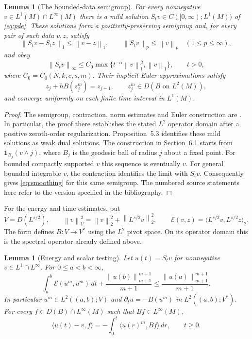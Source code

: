 \documentclass[11pt]{article}
\newtheorem{lemma}[theorem]{Lemma}
\theoremstyle{remark}
\newcommand{\E}{\mathcal E}
\newcommand{\norm}[1]{\left\lVert#1\right\rVert}
\begin{document}
\begin{lemma}[The bounded-data semigroup]\label{lem:semigroup}
For every nonnegative $v\in L^1(M)\cap L^\infty(M)$ there is a mild
solution $S_tv\in C([0,\infty);L^1(M))$ of \eqref{eq:pde}.
These solutions form a positivity-preserving semigroup and, for every
pair of such data $v,z$, satisfy
\begin{equation}\label{eq:contraction}
 \norm{S_tv-S_tz}_1\le\norm{v-z}_1,
 \qquad \norm{S_tv}_p\le\norm v_p\quad(1\le p\le\infty),
\end{equation}
and obey
\begin{equation}\label{eq:smoothing}
 \norm{S_tv}_\infty\le C_0
   \max\{t^{-\alpha}\norm v_1^\beta,\norm v_1\},\qquad t>0,
\end{equation}
where $C_0=C_0(N,k,c,s,m)$. Their implicit Euler approximations satisfy
\begin{equation}\label{eq:euler}
 z_j+hB(z_j^m)=z_{j-1},\qquad z_j^m\in D(B\text{ on }L^2(M)),
\end{equation}
and converge uniformly on each finite time interval in $L^1(M)$.
\end{lemma}

\begin{proof}
The semigroup, contraction, norm estimates and Euler construction are
\cite[Proposition~5.1 and (5.5)--(5.7)]{BBGM}. In particular, the proof
there establishes the stated $L^2$ operator domain after a positive
zeroth-order regularization. Proposition~5.3 identifies these mild
solutions as weak dual solutions. The construction in Section~6.1 starts
from $\mathbf1_{B_j}(v\wedge j)$, where $B_j$ is the geodesic ball of
radius $j$ about a fixed point. For bounded compactly supported $v$
this sequence is eventually $v$. For general bounded integrable $v$,
the contraction identifies the limit with $S_tv$.
Consequently \cite[Theorem~2.6, (2.13)]{BBGM} gives
\eqref{eq:smoothing} for this same semigroup. The numbered source
statements here refer to the version specified in the bibliography.
\end{proof}

For the energy and time estimates, put
\[
 V=D(L^{s/2}),\qquad
 \norm v_V^2=\norm v_2^2+\norm{L^{s/2}v}_2^2,
 \qquad \E(v,z)=\langle L^{s/2}v,L^{s/2}z\rangle_2.
\]
The form defines $B:V\to V^*$ using the $L^2$ pivot space. On its
operator domain this is the spectral operator already defined above.

\begin{lemma}[Energy and scalar testing]\label{lem:energy}
Let $u(t)=S_tv$ for nonnegative $v\in L^1\cap L^\infty$. For
$0\le a<b<\infty$,
\begin{equation}\label{eq:energy}
 \int_a^b\E(u^m,u^m)\,dt+
 \frac{\norm{u(b)}_{m+1}^{m+1}}{m+1}
 \le\frac{\norm{u(a)}_{m+1}^{m+1}}{m+1}.
\end{equation}
In particular $u^m\in L^2((a,b);V)$ and
$\partial_tu=-B(u^m)$ in $L^2((a,b);V^*)$.
For every $f\in D(B)\cap L^\infty(M)$ such that $Bf\in L^\infty(M)$,
\begin{equation}\label{eq:scalar}
 \langle u(t)-v,f\rangle
   =-\int_0^t\langle u(r)^m,Bf\rangle\,dr,\qquad t\ge0.
\end{equation}
\end{lemma}
\end{document}
